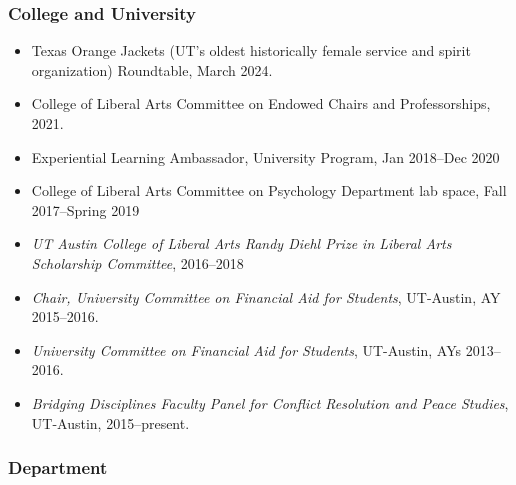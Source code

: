 \documentclass[10pt]{article}
\begin{document}
\subsubsection*{College and University}

\begin{itemize}\setlength{\itemsep}{1pt}
\item Texas Orange Jackets (UT's oldest historically female service and spirit organization) Roundtable, March 2024.
\item College of Liberal Arts Committee on Endowed Chairs and Professorships, 2021.
\item Experiential Learning Ambassador, University Program, Jan 2018--Dec 2020
\item College of Liberal Arts Committee on Psychology Department lab space, Fall 2017--Spring 2019
\item \textit{UT Austin College of Liberal Arts Randy Diehl Prize in Liberal Arts Scholarship Committee}, 2016--2018
\item \textit{Chair, University Committee on Financial Aid for Students}, UT-Austin, AY 2015--2016.
\item \textit{University Committee on Financial Aid for Students}, UT-Austin, AYs 2013--2016.
\item \textit{Bridging Disciplines Faculty Panel for Conflict Resolution and Peace Studies}, UT-Austin, 2015--present.


\end{itemize}

\subsubsection*{Department}
\end{document}
